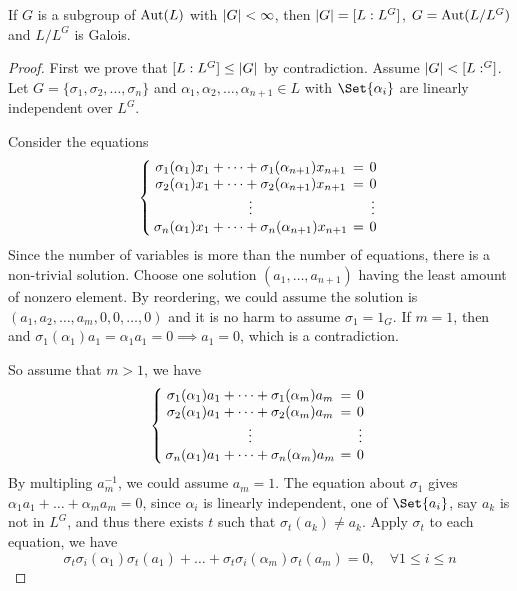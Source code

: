\begin{theorem} \label{thm:extension-of-fix-field-is-galois}
  If $G$ is a subgroup of $\operatorname{Aut}(L)$ with $\lvert G\rvert < \infty$, then $\lvert G\rvert = [L: L^G]$,
  $G = \operatorname{Aut}(L / L^G)$ and $L / L^G$ is Galois.

  \begin{proof}
    First we prove that $[L: L^G] \leq \lvert G\rvert$ by contradiction.
    Assume $\lvert G\rvert < [L: ^G]$. \\
    Let $G = \{\sigma_1, \sigma_2, \dots, \sigma_n\}$ and $\alpha_1, \alpha_2, \dots, \alpha_{n+1} \in L$
    with $\Set{\alpha_i}$ are linearly independent over $L^G$.

    Consider the equations
    \[
      \left\{
        \arraycolsep=2pt
        \begin{array}{ccc}
          \sigma_1(\alpha_1) x_1 + \dots + \sigma_1(\alpha_{n+1}) x_{n+1} &=& 0 \\
          \sigma_2(\alpha_1) x_1 + \dots + \sigma_2(\alpha_{n+1}) x_{n+1} &=& 0 \\
          \vdots & & \vdots \\
          \sigma_n(\alpha_1) x_1 + \dots + \sigma_n(\alpha_{n+1}) x_{n+1} &=& 0 \\
        \end{array}
      \right.
    \]
    Since the number of variables is more than the number of equations, there is a
    non-trivial solution. Choose one solution $(a_1, \dots, a_{n+1})$ having the
    least amount of nonzero element. By reordering, we could assume
    the solution is $(a_1, a_2, \dots, a_m, 0, 0, \dots, 0)$ and it is no harm to assume $\sigma_1 = 1_G$.
    If $m = 1$, then and $\sigma_1(\alpha_1) a_1 = \alpha_1 a_1 = 0 \implies a_1 = 0$,
    which is a contradiction.

    So assume that $m > 1$, we have
    \[
      \left\{
        \arraycolsep=2pt
        \begin{array}{ccc}
          \sigma_1(\alpha_1) a_1 + \dots + \sigma_1(\alpha_{m}) a_{m} &=& 0 \\
          \sigma_2(\alpha_1) a_1 + \dots + \sigma_2(\alpha_{m}) a_{m} &=& 0 \\
          \vdots & & \vdots \\
          \sigma_n(\alpha_1) a_1 + \dots + \sigma_n(\alpha_{m}) a_{m} &=& 0 \\
        \end{array}
      \right.
    \]
    By multipling $a_m^{-1}$, we could assume $a_m = 1$. The equation about $\sigma_1$ gives
    $\alpha_1 a_1 + \dots + \alpha_m a_m = 0$, since $\alpha_i$ is linearly independent,
    one of $\Set{a_i}$, say $a_k$ is not in $L^G$, and thus there exists $t$
    such that $\sigma_t(a_k) \neq a_k$. Apply $\sigma_t$ to each equation, we have
    \[ \sigma_t\sigma_i(\alpha_1) \sigma_t(a_1) + \dots + \sigma_t \sigma_i(\alpha_m) \sigma_t(a_m) = 0,\quad
      \forall 1 \leq i \leq n \]


\end{proof}
\end{theorem}
